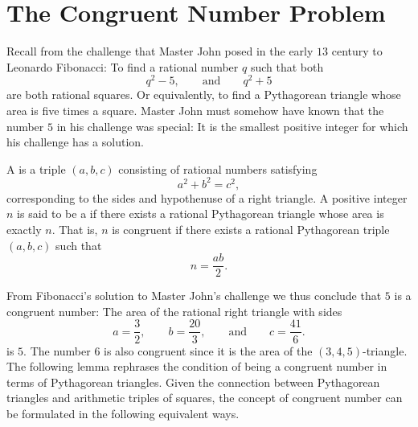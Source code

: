 \section{The Congruent Number Problem}\label{section:congruent-number-problem}

Recall from  the challenge that Master John posed in the early $13$\supth{} century to Leonardo Fibonacci: To find a rational number $q$ such that both
\begin{equation*}
  q^2-5,\qquad\text{and}\qquad q^2+5
\end{equation*}
are both rational squares. Or equivalently, to find a Pythagorean triangle whose area is five times a square. Master John must somehow have known that the number $5$ in his challenge was special: It is the smallest positive integer for which his challenge has a solution.

\begin{definition}
  A  is a triple $(a,b,c)$ consisting of rational numbers satisfying
  \begin{equation*}
    a^2+b^2=c^2,
  \end{equation*}
  corresponding to the sides and hypothenuse of a right triangle. A positive integer $n$ is said to be a  if there exists a rational Pythagorean triangle whose area is exactly $n$. That is, $n$ is congruent if there exists a rational Pythagorean triple $(a,b,c)$ such that
  \begin{equation*}
    n=\frac{ab}{2}.
  \end{equation*}
\end{definition}

From Fibonacci's solution to Master John's challenge we thus conclude that $5$ is a congruent number: The area of the rational right triangle with sides
\begin{equation*}
  a=\frac{3}{2},\qquad b=\frac{20}{3},\qquad\text{and}\qquad c=\frac{41}{6}.
\end{equation*}
is $5$. The number $6$ is also congruent since it is the area of the $(3,4,5)$-triangle. The following lemma rephrases the condition of being a congruent number in terms of Pythagorean triangles. Given the connection between Pythagorean triangles and arithmetic triples of squares, the concept of congruent number can be formulated in the following equivalent ways.

